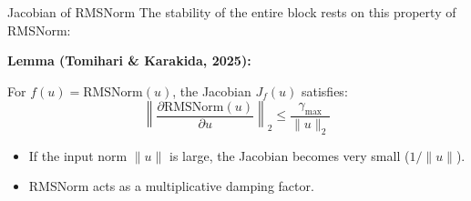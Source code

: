 \documentclass[aspectratio=169, 11pt]{beamer}
\newcommand{\norm}[1]{\left\|#1\right\|}
\newcommand{\RMS}{\mathrm{RMSNorm}}
\begin{document}



\begin{frame}{Jacobian of RMSNorm}
    The stability of the entire block rests on this property of RMSNorm:
    \vspace{1em}

    \textbf{Lemma (Tomihari \& Karakida, 2025):}

    For $f(u) = \RMS(u)$, the Jacobian $J_f(u)$ satisfies:
    \[ \norm{\frac{\partial \RMS(u)}{\partial u}}_2 \le \frac{\gamma_{\max}}{\|u\|_2} \]

    \vspace{1em}
    \begin{itemize}
        \item If the input norm $\|u\|$ is large, the Jacobian becomes very small ($1/\|u\|$).
        \item RMSNorm acts as a multiplicative damping factor.
    \end{itemize}
\end{frame}
\end{document}
